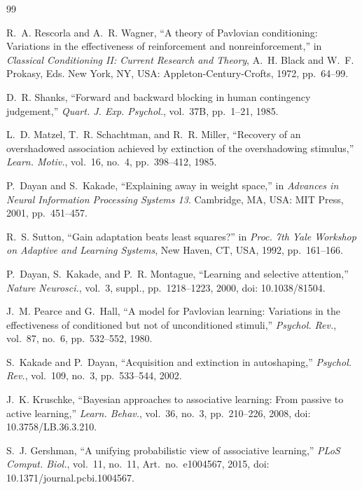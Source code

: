\documentclass[conference,a4paper]{IEEEtran}
\begin{document}
\begin{thebibliography}{99}

R.~A. Rescorla and A.~R. Wagner, ``A theory of Pavlovian conditioning: Variations
in the effectiveness of reinforcement and nonreinforcement,'' in \emph{Classical
Conditioning II: Current Research and Theory}, A.~H. Black and W.~F. Prokasy, Eds.
New York, NY, USA: Appleton-Century-Crofts, 1972, pp.~64--99.

D.~R. Shanks, ``Forward and backward blocking in human contingency judgement,''
\emph{Quart. J. Exp. Psychol.}, vol.~37B, pp.~1--21, 1985.

L.~D. Matzel, T.~R. Schachtman, and R.~R. Miller, ``Recovery of an overshadowed
association achieved by extinction of the overshadowing stimulus,''
\emph{Learn. Motiv.}, vol.~16, no.~4, pp.~398--412, 1985.

P.~Dayan and S.~Kakade, ``Explaining away in weight space,'' in \emph{Advances in
Neural Information Processing Systems 13}. Cambridge, MA, USA: MIT Press, 2001,
pp.~451--457.

R.~S. Sutton, ``Gain adaptation beats least squares?'' in \emph{Proc. 7th Yale
Workshop on Adaptive and Learning Systems}, New Haven, CT, USA, 1992, pp.~161--166.

P.~Dayan, S.~Kakade, and P.~R. Montague, ``Learning and selective attention,''
\emph{Nature Neurosci.}, vol.~3, suppl., pp.~1218--1223, 2000,
doi: 10.1038/81504.

J.~M. Pearce and G.~Hall, ``A model for Pavlovian learning: Variations in the
effectiveness of conditioned but not of unconditioned stimuli,''
\emph{Psychol. Rev.}, vol.~87, no.~6, pp.~532--552, 1980.

S.~Kakade and P.~Dayan, ``Acquisition and extinction in autoshaping,''
\emph{Psychol. Rev.}, vol.~109, no.~3, pp.~533--544, 2002.

J.~K. Kruschke, ``Bayesian approaches to associative learning: From passive to
active learning,'' \emph{Learn. Behav.}, vol.~36, no.~3, pp.~210--226, 2008,
doi: 10.3758/LB.36.3.210.

S.~J. Gershman, ``A unifying probabilistic view of associative learning,''
\emph{PLoS Comput. Biol.}, vol.~11, no.~11, Art.~no.~e1004567, 2015,
doi: 10.1371/journal.pcbi.1004567.


\end{thebibliography}
\end{document}

